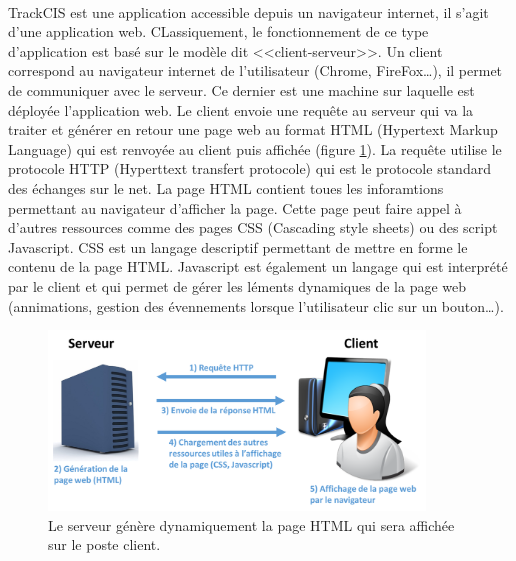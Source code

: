 			\paragraph{}%
			TrackCIS est une application accessible depuis un navigateur internet, il
			s'agit d'une application web. CLassiquement, le fonctionnement de ce type
			d'application est basé sur le modèle dit <<client-serveur>>. Un client
			correspond au navigateur internet de l'utilisateur (Chrome, FireFox\ldots),
			il permet de communiquer avec le serveur. Ce dernier est une machine sur
			laquelle est déployée l'application web. Le client envoie une requête au
			serveur qui va la traiter et générer en retour une page web au format HTML
			(Hypertext Markup Language) qui est renvoyée au client puis affichée
			(figure \ref{client_serveur}). La requête utilise le protocole HTTP
			(Hyperttext transfert protocole) qui est le protocole standard des échanges
			sur le net. La page HTML contient toues les inforamtions permettant au
			navigateur d'afficher la page. Cette page peut faire appel à d'autres
			ressources comme des pages CSS (Cascading style sheets) ou des script
			Javascript. CSS est un langage descriptif permettant de mettre en forme le contenu de la page HTML.
			Javascript est également un langage qui est interprété par le client et qui
			permet de gérer les léments dynamiques de la page web (annimations, gestion
			des évennements lorsque l'utilisateur clic sur un bouton\ldots).
			\begin{figure}[H]
				\centering
				\includegraphics[width=10cm]{../img/part3/client_serveur.png}
				\caption{\label{client_serveur} Le serveur génère dynamiquement la page
				HTML qui sera affichée sur le poste client.}
			\end{figure}
			
